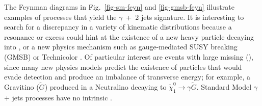 \documentclass[12pt,twoside,letterpaper,doublespace]{article}
\begin{document}
The Feynman diagrams in Fig.~\ref{fig-sm-feyn} and \ref{fig-gmsb-feyn} illustrate examples of processes that yield the $\gamma$~+~2 jets signature.  It is interesting to search for a discrepancy in a variety of kinematic distributions because a resonance or excess could hint at the existence of a new heavy particle decaying into \phojets, or a new physics mechanism such as gauge-mediated SUSY breaking (GMSB) \cite{ref:models} or Technicolor \cite{ref:TechnicolorModel}. Of particular interest are events with large missing \et (\met), since many new physics models predict the existence of particles that would evade detection and produce an imbalance of transverse energy; for example, a Gravitino ($\tilde{G}$) produced in a Neutralino decaying to $\tilde{\chi}^{0}_{1}\to\gamma \tilde{G}$.  Standard Model $\gamma$ + jets processes have no intrinsic \met.
\end{document}

